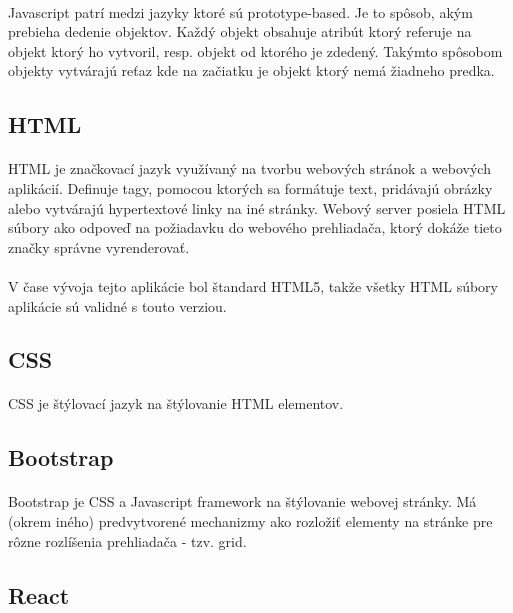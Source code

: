 \paragraph{}
Javascript patrí medzi jazyky ktoré sú prototype-based. Je to spôsob, akým prebieha dedenie objektov. Každý objekt obsahuje atribút ktorý referuje na objekt ktorý ho vytvoril, resp. objekt od ktorého je zdedený. Takýmto spôsobom objekty vytvárajú reťaz kde na začiatku je objekt ktorý nemá žiadneho predka.

\subsection{HTML}
\paragraph{}
HTML je značkovací jazyk využívaný na tvorbu webových stránok a webových aplikácií. Definuje tagy, pomocou ktorých sa formátuje text, pridávajú obrázky alebo vytvárajú hypertextové linky na iné stránky. Webový server posiela HTML súbory ako odpoveď na požiadavku do webového prehliadača, ktorý dokáže tieto značky správne vyrenderovať.
\paragraph{}
V čase vývoja tejto aplikácie bol štandard HTML5, takže všetky HTML súbory aplikácie sú validné s touto verziou.

\subsection{CSS}
\paragraph{}
CSS je štýlovací jazyk na štýlovanie HTML elementov.

\subsection{Bootstrap}
\paragraph{}
Bootstrap je CSS a Javascript framework na štýlovanie webovej stránky. Má (okrem iného) predvytvorené mechanizmy ako rozložiť elementy na stránke pre rôzne rozlíšenia prehliadača - tzv. grid.

\subsection{React}
